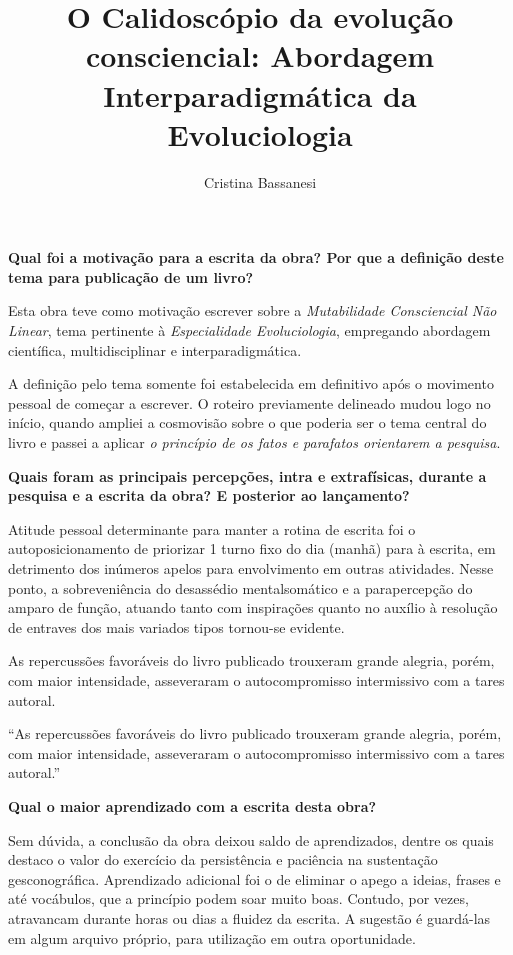 \documentclass{gescons}
\author{Cristina Bassanesi}
\title{O Calidoscópio da evolução consciencial: Abordagem Interparadigmática da Evoluciologia}
\begin{document}
    \makeentrevistatitle

    \begin{multicols}{2}

\textbf{Qual foi a motivação para a escrita da obra? Por que a definição deste tema para publicação de um livro?}

Esta obra teve como motivação escrever sobre a \textit{Mutabilidade Consciencial Não Linear}, tema pertinente à \textit{Especialidade Evoluciologia}, empregando abordagem científica, multidisciplinar e interparadigmática.

A definição pelo tema somente foi estabelecida em definitivo após o movimento pessoal de começar a escrever. O roteiro previamente delineado mudou logo no início, quando ampliei a cosmovisão sobre o que poderia ser o tema central do livro e passei a aplicar \textit{o princípio de os fatos e parafatos orientarem a pesquisa}.

\textbf{Quais foram as principais percepções, intra e extrafísicas, durante a pesquisa e a escrita da obra? E posterior ao lançamento?}

Atitude pessoal determinante para manter a rotina de escrita foi o autoposicionamento de priorizar 1 turno fixo do dia (manhã) para à escrita, em detrimento dos inúmeros apelos para envolvimento em outras atividades. Nesse ponto, a sobreveniência do desassédio mentalsomático e a parapercepção do amparo de função, atuando tanto com inspirações quanto no auxílio à resolução de entraves dos mais variados tipos tornou-se evidente.

As repercussões favoráveis do livro publicado trouxeram grande alegria, porém, com maior intensidade, asseveraram o autocompromisso intermissivo com a tares autoral. 

\begin{pullquote}
``As repercussões favoráveis do livro publicado trouxeram grande alegria, porém, com maior intensidade, asseveraram o autocompromisso intermissivo com a tares autoral.''
\end{pullquote}

\textbf{Qual o maior aprendizado com a escrita desta obra?}

Sem dúvida, a conclusão da obra deixou saldo de aprendizados, dentre os quais destaco o valor do exercício da persistência e paciência na sustentação gesconográfica. Aprendizado adicional foi o de eliminar o apego a ideias, frases e até vocábulos, que a princípio podem soar muito boas. Contudo, por vezes, atravancam durante horas ou dias a fluidez da escrita. A sugestão é guardá-las em algum arquivo próprio, para utilização em outra oportunidade. 


\end{multicols}
\end{document}
